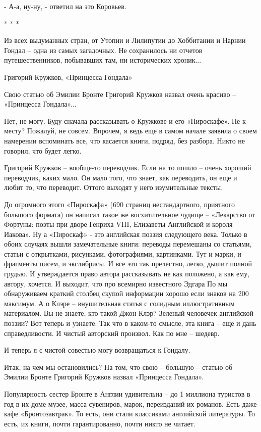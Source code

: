 - А-а, ну-ну, - ответил на это Коровьев.

* * *

Из всех выдуманных стран, от Утопии и Лилипутии до Хоббитании и Нарнии Гондал –
одна из самых загадочных. Не сохранилось ни отчетов путешественников,
побывавших там, ни исторических хроник...

Григорий Кружков, «Принцесса Гондала»

Свою статью об Эмилии Бронте Григорий Кружков назвал очень красиво – «Принцесса
Гондала»...

Нет, не могу. Буду сначала рассказывать о Кружкове и его «Пироскафе». Не к
месту? Пожалуй, не совсем. Впрочем, я ведь еще в самом начале заявила о своем
намерении вспоминать все, что касается книги, подряд, без разбора. Никто не
говорил, что будет легко.

Григорий Кружков – вообще-то переводчик. Если на то пошло – очень хороший
переводчик, каких мало. Он мало того, что знает, как переводить, он еще и любит
то, что переводит. Оттого выходят у него изумительные тексты.

До огромного этого «Пироскафа» (690 страниц нестандартного, приятного большого
формата) он написал такое же восхитительное чудище – «Лекарство от Фортуны:
поэты при дворе Генриха VIII, Елизаветы Английской и короля Иакова». Ну а
«Пироскаф» - это английская поэзия следующего века. Только в обоих случаях
вышли замечательные книги: переводы перемешаны со статьями, статьи с
открытками, рисунками, фотографиями, картинками. Тут и марки, и фрагменты
писем, и экслибрисы. И все это так прелестно, легко, дышит полной грудью. И
утверждается право автора рассказывать не как положено, а как ему, автору,
хочется. И выходит, что про всемирно известного Эдгара По мы обнаруживаем
краткий столбец скупой информации хорошо если знаков на 200 максимум. А о Клэре
– внушительная статья с солидным иллюстративным материалом. Вы не знаете, кто
такой Джон Клэр? Зеленый человечек английской поэзии? Вот теперь и узнаете. Так
что в каком-то смысле, эта книга – еще и дань справедливости. И чистый
авторский произвол. Как по мне – шедевр.

И теперь я с чистой совестью могу возвращаться к Гондалу.

Итак, на чем мы остановились? На том, что свою – большую – статью об Эмилии
Бронте Григорий Кружков назвал «Принцесса Гондала».

Популярность сестер Бронте в Англии удивительна – до 1 миллиона туристов в год
в их доме-музее, масса сувениров, марок, переизданий их романов. Есть даже кафе
«Бронтозавтрак». То есть, они стали классиками английской литературы. То есть,
их книги, почти гарантированно, почти никто не читает.

